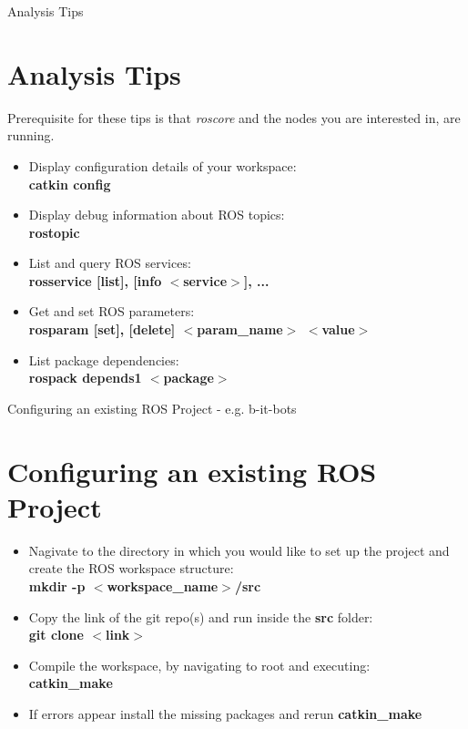 \documentclass[11pt]{beamer}
\newcommand{\nologo}{\setbeamertemplate{logo}{}}
\newcommand{\reducedfontsize}{\fontsize{9pt}{10.8}\selectfont}
\begin{document}
	{\nologo\reducedfontsize
	\begin{frame}{Analysis Tips}
		\section{Analysis Tips}
		Prerequisite for these tips is that \textit{roscore} and the nodes you are interested in, are running.
		\begin{itemize}
			\item{Display configuration details of your workspace:\\ \textbf{catkin config}}
			\item{Display debug information about ROS topics:\\ \textbf{rostopic}}
			\item{List and query ROS services:\\ \textbf{rosservice [list], [info $<$service$>$], ...}}
			\item{Get and set ROS parameters:\\ \textbf{rosparam [set], [delete]  $<$param\_name$>$ $<$value$>$}}
			\item{List package dependencies:\\ \textbf{rospack depends1 $<$package$>$}}
		\end{itemize}
	\end{frame}}

	\begin{frame}{Configuring an existing ROS Project - e.g. b-it-bots}
		\section{Configuring an existing ROS Project}
		\begin{itemize}
			\item{Nagivate to the directory in which you would like to set up the project and create the ROS workspace structure:\\ \textbf{mkdir -p $<$workspace\_name$>$/src}}
			\item{Copy the link of the git repo(s) and run inside the \textbf{src} folder:\\ \textbf{git clone $<$link$>$}}
			\item{Compile the workspace, by navigating to root and executing:\\ \textbf{catkin\_make}}
			\item{If errors appear install the missing packages and rerun \textbf{catkin\_make}}
		\end{itemize}
	\end{frame}
\end{document}
